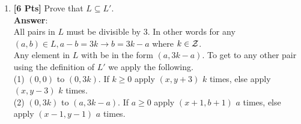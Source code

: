 \begin{enumerate}
\begin{enumerate}
\item {\bf [6 Pts]}	Prove that $L \subseteq L'$.\\
\textbf{Answer}:\\
		
All pairs in $L$ must be divisible by $3$. In other words for any $(a,b) \in L, a-b = 3k \rightarrow b = 3k - a$ where $k \in \cal Z$.\\
Any element in $L$ with be in the form $(a, 3k-a)$. To get to any other pair using the definition of $L'$ we apply the following.\\

(1) $(0,0)$ to $(0, 3k)$. If $k \geq 0$ apply $(x, y+3)$ $k$ times, else apply $(x, y-3)$ $k$ times.\\
(2) $(0, 3k)$ to $(a, 3k - a)$. If $a \geq 0$ apply $(x+1, b+1)$ $a$ times, else apply $(x-1, y-1)$ $a$ times.
			
\end{enumerate}

\end{enumerate}

